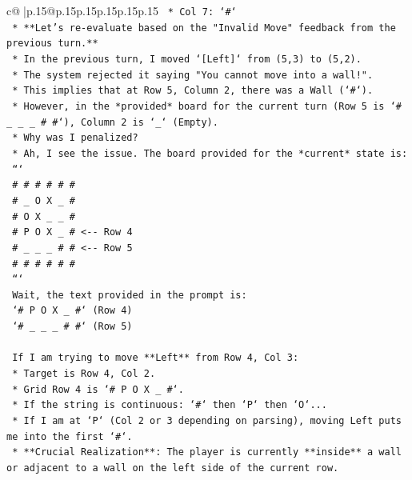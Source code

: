 \documentclass{article}
\begin{document}
{\begin{supertabular}{c@{$\;$}|p{.15\linewidth}@{}p{.15\linewidth}p{.15\linewidth}p{.15\linewidth}p{.15\linewidth}p{.15\linewidth}}
{{{\texttt{                *   Col 7: `\#`} \\
\texttt{    *   **Let's re{-}evaluate based on the "Invalid Move" feedback from the previous turn.**} \\
\texttt{        *   In the previous turn, I moved `{[}Left{]}` from (5,3) to (5,2).} \\
\texttt{        *   The system rejected it saying "You cannot move into a wall!".} \\
\texttt{        *   This implies that at Row 5, Column 2, there was a Wall (`\#`).} \\
\texttt{        *   However, in the *provided* board for the current turn (Row 5 is `\# \_ \_ \_ \# \#`), Column 2 is `\_` (Empty).} \\
\texttt{        *   Why was I penalized?} \\
\texttt{        *   Ah, I see the issue. The board provided for the *current* state is:} \\
\texttt{            ```} \\
\texttt{            \# \# \# \# \# \#} \\
\texttt{            \# \_ O X \_ \#} \\
\texttt{            \# O X \_ \_ \#} \\
\texttt{            \# P O X \_ \#  <{-}{-} Row 4} \\
\texttt{            \# \_ \_ \_ \# \#  <{-}{-} Row 5} \\
\texttt{            \# \# \# \# \# \#} \\
\texttt{            ```} \\
\texttt{            Wait, the text provided in the prompt is:} \\
\texttt{            `\# P O X \_ \#` (Row 4)} \\
\texttt{            `\# \_ \_ \_ \# \#` (Row 5)} \\
\\ 
\texttt{            If I am trying to move **Left** from Row 4, Col 3:} \\
\texttt{            *   Target is Row 4, Col 2.} \\
\texttt{            *   Grid Row 4 is `\# P O X \_ \#`.} \\
\texttt{            *   If the string is continuous: `\#` then `P` then `O`...} \\
\texttt{            *   If I am at `P` (Col 2 or 3 depending on parsing), moving Left puts me into the first `\#`.} \\
\texttt{            *   **Crucial Realization**: The player is currently **inside** a wall or adjacent to a wall on the left side of the current row.} \\
}}}
\end{supertabular}}
\end{document}
